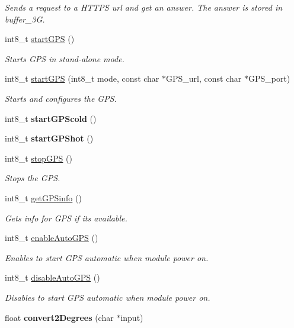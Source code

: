 \begin{DoxyCompactItemize}
\begin{DoxyCompactList}\small\item\em Sends a request to a H\+T\+T\+PS url and get an answer. The answer is stored in \textquotesingle{}buffer\+\_\+3G\textquotesingle{}. \end{DoxyCompactList}\item 
int8\+\_\+t \hyperlink{class_wasp3_g_a6cb856b19015b41f4bdbb846102baad6}{start\+G\+PS} ()
\begin{DoxyCompactList}\small\item\em Starts G\+PS in stand-\/alone mode. \end{DoxyCompactList}\item 
int8\+\_\+t \hyperlink{class_wasp3_g_a0ede83b64c7f5f19e6b3fec3764320fd}{start\+G\+PS} (int8\+\_\+t mode, const char $\ast$G\+P\+S\+\_\+url, const char $\ast$G\+P\+S\+\_\+port)
\begin{DoxyCompactList}\small\item\em Starts and configures the G\+PS. \end{DoxyCompactList}\item 
int8\+\_\+t {\bfseries start\+G\+P\+Scold} ()\hypertarget{class_wasp3_g_a9b9c83499155ffb145695ecd06b54575}{}\label{class_wasp3_g_a9b9c83499155ffb145695ecd06b54575}

\item 
int8\+\_\+t {\bfseries start\+G\+P\+Shot} ()\hypertarget{class_wasp3_g_a45be6c917533c30b57c8429aca32c308}{}\label{class_wasp3_g_a45be6c917533c30b57c8429aca32c308}

\item 
int8\+\_\+t \hyperlink{class_wasp3_g_ae93cf55f81ad488086c0677b4c290d03}{stop\+G\+PS} ()
\begin{DoxyCompactList}\small\item\em Stops the G\+PS. \end{DoxyCompactList}\item 
int8\+\_\+t \hyperlink{class_wasp3_g_a1a666cd4931c854373d785736caffce2}{get\+G\+P\+Sinfo} ()
\begin{DoxyCompactList}\small\item\em Gets info for G\+PS if it\textquotesingle{}s available. \end{DoxyCompactList}\item 
int8\+\_\+t \hyperlink{class_wasp3_g_ab7798ea73bc634310d79c27f2d626dbf}{enable\+Auto\+G\+PS} ()
\begin{DoxyCompactList}\small\item\em Enables to start G\+PS automatic when module power on. \end{DoxyCompactList}\item 
int8\+\_\+t \hyperlink{class_wasp3_g_a59e4136945246c3832234b99f749d293}{disable\+Auto\+G\+PS} ()
\begin{DoxyCompactList}\small\item\em Disables to start G\+PS automatic when module power on. \end{DoxyCompactList}\item 
float {\bfseries convert2\+Degrees} (char $\ast$input)\hypertarget{class_wasp3_g_ad39e4fd2ca380620bde0a2839457ea29}{}\label{class_wasp3_g_ad39e4fd2ca380620bde0a2839457ea29}


\end{DoxyCompactItemize}
